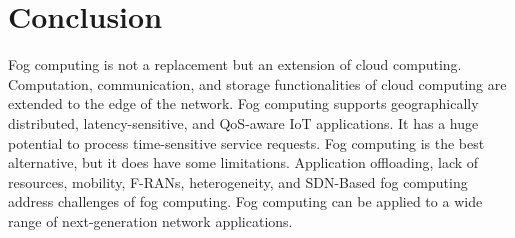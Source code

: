 \section{Conclusion}

Fog computing is not a replacement but an extension of cloud computing. Computation, communication, and storage functionalities of cloud computing are extended to the edge of the network. Fog computing supports geographically distributed, latency-sensitive, and QoS-aware IoT applications. It has a huge potential to process time-sensitive service requests. Fog computing is the best alternative, but it does have some limitations. Application offloading, lack of resources, mobility, F-RANs, heterogeneity, and SDN-Based fog computing address challenges of fog computing. Fog computing can be applied to a wide range of next-generation network applications.
